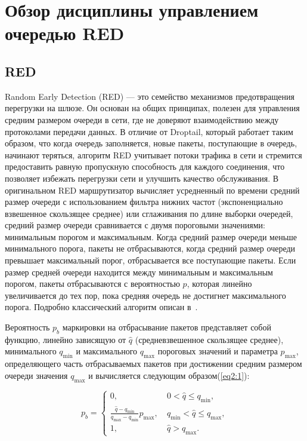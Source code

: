 \chapter{Обзор дисциплины управлением очередью RED}
\label{chap2}

\section{RED}
\label{chap2:sec1}

Random Early Detection (RED) — это семейство механизмов предотвращения перегрузки
на шлюзе. Он основан на общих принципах, полезен для управления
средним размером очереди в сети, где не доверяют взаимодействию между
протоколами передачи данных. В отличие от Droptail, который работает
таким образом, что когда очередь заполняется, новые пакеты,
поступающие в очередь, начинают теряться, алгоритм RED учитывает
потоки трафика в сети и стремится предоставить равную пропускную
способность для каждого соединения, что позволяет избежать перегрузки
сети и улучшить качество обслуживания. В оригинальном RED
маршрутизатор вычисляет усредненный по времени средний размер очереди
с использованием фильтра нижних частот (экспоненциально взвешенное
скользящее среднее) или сглаживания по длине выборки очередей, средний
размер очереди сравнивается с двумя пороговыми значениями: минимальным
порогом и максимальным. Когда средний размер очереди меньше
минимального порога, пакеты не отбрасываются, когда средний размер
очереди превышает максимальный порог, отбрасывается все поступающие
пакеты. Если размер средней очереди находится между минимальным и
максимальным порогом, пакеты отбрасываются с вероятностью $p$, которая
линейно увеличивается до тех пор, пока средняя очередь не достигнет
максимального порога. Подробно классический алгоритм описан в~\cite{RED1, RED0}.
 
Вероятность $p_{b}$ маркировки на отбрасывание пакетов представляет
собой функцию, линейно зависящую от $\hat{q}$ (средневзвешенное
скользящее среднее), минимального $q_{\min}$ и максимального
$q_{\max}$ пороговых значений и параметра $p_{\max}$, определяющего
часть отбрасываемых пакетов при достижении средним размером очереди
значения $q_{\max}$ и вычисляется следующим образом(\ref{eq2:1}):

\begin{equation}
\label{eq2:1}
p_{b} = \begin{cases}
        0, &  \ 0 < \hat{q} \leqslant q_{\min},
        \\
        \frac{\hat{q} - q_{\min}}{q_{\max} - q_{\min}} p_{\max}, & \ q_{\min} < \hat{q} \leqslant q_{\max}, 
        \\
        1, &  \ \hat{q} > q_{\max}.
\end{cases}                                     
\end{equation}


